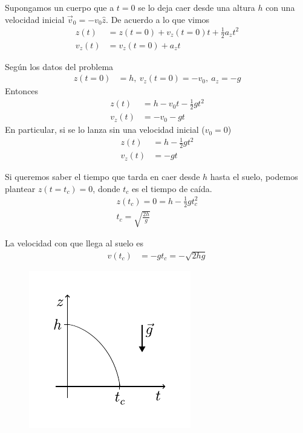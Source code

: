 \para
Supongamos un cuerpo que a $t=0$ se lo deja caer desde una altura $h$ con una velocidad inicial 
$\vec{v}_0 = -v_0\hat{z}$. De acuerdo a lo que vimos
\begin{align*}
  z(t) &= z(t=0) + v_z(t=0)t + \frac{1}{2}a_z t^2 \\
  v_z(t) &= v_z(t=0) + a_zt
\end{align*}

Según los datos del problema
\begin{align*}
  z(t=0) &= h, \ v_z (t=0) = -v_0, \ a_z = -g
\end{align*}
Entonces
\begin{align*}
  z(t) &= h -v_0t-\frac{1}{2}g t^2 \\
  v_z(t) &= -v_0-g t
\end{align*}
En particular, si se lo lanza sin una velocidad inicial ($v_0=0$)
\begin{align*}
  z(t) &= h -\frac{1}{2}g t^2 \\
  v_z(t) &= -g t
\end{align*}

Si queremos saber el tiempo que tarda en caer desde $h$ hasta el suelo, podemos
plantear $z(t=t_c) =0$, donde $t_c$ es el tiempo de caída.
\begin{align*}
  z(t_c) = 0 = h -\frac{1}{2}g t^2_c \\
  t_c = \sqrt{\frac{2h}{g}}
\end{align*}

La velocidad con que llega al suelo es
\begin{align*}
  v(t_c) &= -gt_c = -\sqrt{2hg}
\end{align*}

\begin{figure}[H]
  \centering
  \includegraphics[]{images/f1-13.pdf}
  \caption{}
\end{figure}

